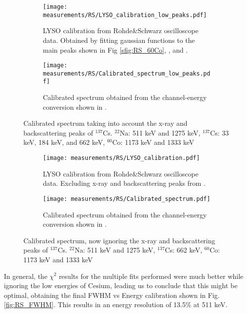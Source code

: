 \begin{figure}[H]
  \begin{subfigure}[t]{\textwidth}
    \centering
    \texttt{[image: measurements/RS/LYSO\_calibration\_low\_peaks.pdf]}
    \caption{\label{sfig:RS_LYSO_calibration_low_peaks}LYSO calibration from Rohde\&Schwarz oscilloscope data. Obtained by fitting gaussian functions to the main peaks shown in Fig \ref{sfig:RS_60Co}, , and .}
  \end{subfigure}
  \medskip
  \begin{subfigure}[t]{\textwidth}
    \centering
    \texttt{[image: measurements/RS/Calibrated\_spectrum\_low\_peaks.pdf]}
    \caption{\label{sfig:RS_LYSO_calibrated_spectrum_low_peaks}Calibrated spectrum obtained from the channel-energy conversion shown in .}
  \end{subfigure}
  \caption{\label{fig:RS_low_peaks_calibration}Calibrated spectrum taking into account the x-ray and backscattering peaks of $^{137}$Cs. $^{22}$Na: 511 keV and 1275 keV, $^{137}$Cs: 33 keV, 184 keV, and 662 keV, $^{60}$Co: 1173 keV and 1333 keV}
\end{figure}

\begin{figure}[H]
  \begin{subfigure}[t]{\textwidth}
    \centering
    \texttt{[image: measurements/RS/LYSO\_calibration.pdf]}
    \caption{\label{sfig:RS_LYSO_calibration}LYSO calibration from Rohde\&Schwarz oscilloscope data. Excluding x-ray and backscattering peaks from .}
  \end{subfigure}
  \medskip
  \begin{subfigure}[t]{\textwidth}
    \centering
    \texttt{[image: measurements/RS/Calibrated\_spectrum.pdf]}
    \caption{\label{sfig:RS_LYSO_calibrated_spectrum}Calibrated spectrum obtained from the channel-energy conversion shown in .}
  \end{subfigure}
  \caption{\label{fig:RS_calibration}Calibrated spectrum, now ignoring the x-ray and backscattering peaks of $^{137}$Cs. $^{22}$Na: 511 keV and 1275 keV, $^{137}$Cs: 662 keV, $^{60}$Co: 1173 keV and 1333 keV}
\end{figure}

\newpage
In general, the $\chi^2$ results for the multiple fits performed were much better while ignoring the low energies of Cesium, leading us to conclude that this might be optimal, obtaining the final FWHM vs Energy calibration shown in Fig. \ref{fig:RS_FWHM}. This results in an energy resolution of 13.5\% at 511 keV.

